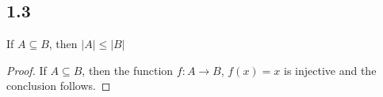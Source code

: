 \subsection*{1.3} If $A \subseteq B$, then $|A| \leq |B|$

\begin{proof}
If $A \subseteq B$, then the function $f:A \rightarrow B$, $f(x) = x$ is injective and the conclusion follows.
\end{proof}

